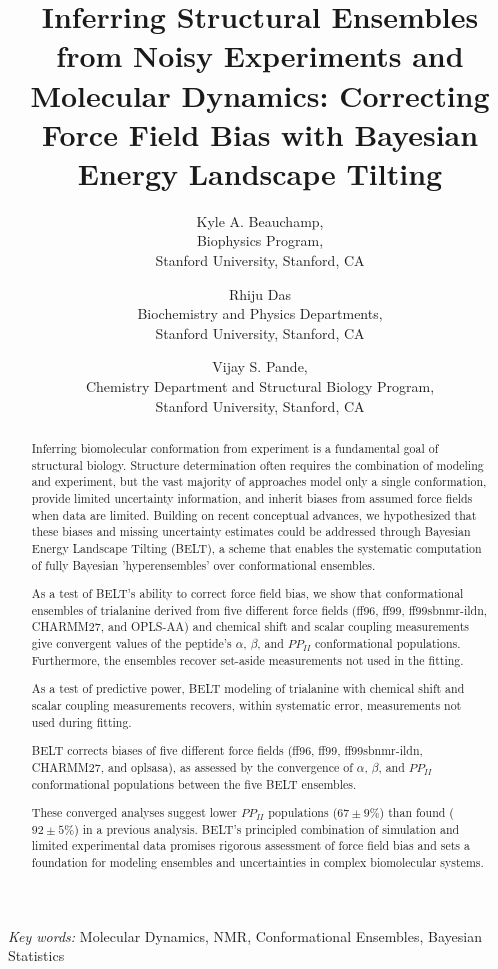 \documentclass[11pt,titlepage]{article}
\author{Kyle A. Beauchamp, \\
Biophysics Program, \\
Stanford University, Stanford, CA
\and Rhiju Das \\
Biochemistry and Physics Departments, \\
Stanford University, Stanford, CA
\and Vijay S. Pande, \\
Chemistry Department and Structural Biology Program, \\
Stanford University, Stanford, CA
}
\title{Inferring Structural Ensembles from Noisy Experiments and Molecular Dynamics: Correcting Force Field Bias with Bayesian Energy Landscape Tilting}
\begin{document}
\maketitle

\begin{abstract}

Inferring biomolecular conformation from experiment is a fundamental goal of structural biology.  Structure determination often requires the combination of modeling and experiment, but the vast majority of approaches model only a single conformation, provide limited uncertainty information, and inherit biases from assumed force fields when data are limited.  Building on recent conceptual advances, we hypothesized that these biases and missing uncertainty estimates could be addressed through Bayesian Energy Landscape Tilting (BELT), a scheme that enables the systematic computation of fully Bayesian 'hyperensembles' over conformational ensembles.  

As a test of BELT's ability to correct force field bias, we show that conformational ensembles of trialanine derived from five different force fields (ff96, ff99, ff99sbnmr-ildn, CHARMM27, and OPLS-AA) and chemical shift and scalar coupling measurements give convergent values of the peptide's $\alpha$, $\beta$, and $PP_{II}$ conformational populations. Furthermore, the ensembles recover set-aside measurements not used in the fitting.

As a test of predictive power, BELT modeling of trialanine with chemical shift and scalar coupling measurements recovers, within systematic error, measurements not used during fitting.  

BELT corrects biases of five different force fields (ff96, ff99, ff99sbnmr-ildn, CHARMM27, and oplsasa), as assessed by the convergence of $\alpha$, $\beta$, and $PP_{II}$ conformational populations between the 
five BELT ensembles.  

These converged analyses suggest lower $PP_{II}$ populations ($67 \pm 9 \%$) than found ($92 \pm 5\%$) in a previous analysis.  BELT's principled combination of simulation and limited experimental data promises rigorous assessment of force field bias and sets a foundation for modeling ensembles and uncertainties in complex biomolecular systems.   

\end{abstract}

\emph{Key words:} Molecular Dynamics, NMR, Conformational Ensembles,  Bayesian Statistics
\end{document}
